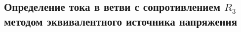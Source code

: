 \subsection{Определение тока в ветви с сопротивлением $R_3$ методом
  эквивалентного источника напряжения}


